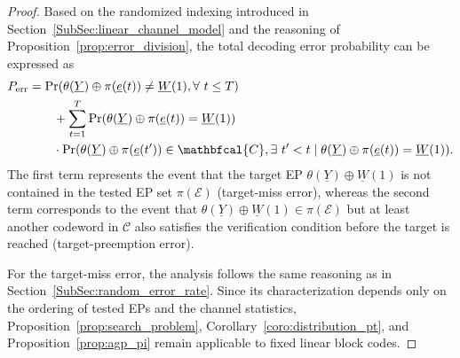 \documentclass[letterpaper,draftclsnofoot,onecolumn]{IEEEtran}
\begin{document}
\begin{proof}
    Based on the randomized indexing introduced in Section~\ref{SubSec:linear_channel_model} and the reasoning of Proposition~\ref{prop:error_division}, the total decoding error probability can be expressed as
    \begin{align}
        P_{\text{err}} & = \Pr(\theta(\underline{Y})\oplus \pi(\underline{e}(t))\neq \underline{W}(1),\forall\ t\leq  T) \notag\\
        & \quad \quad + \sum_{t=1}^{T}\Pr(\theta(\underline{Y})\oplus \pi(\underline{e}(t)) = \underline{W}(1)) \notag\\
        & \quad \quad \cdot\Pr(\theta(\underline{Y})\oplus \pi(\underline{e}(t'))\in \mathbfcal{C},\exists\ t'< t \mid \theta(\underline{Y})\oplus \pi(\underline{e}(t))=\underline{W}(1)). \label{eq:err_div_linear}
    \end{align}
    The first term represents the event that the target EP $\theta(\underline{Y}) \oplus \underline{W}(1)$ is not contained in the tested EP set $\pi(\mathcal{E})$ (target-miss error), whereas the second term corresponds to the event that $\theta(\underline{Y}) \oplus \underline{W}(1)\in\pi(\mathcal{E})$ but at least another codeword in $\mathcal{C}$ also satisfies the verification condition before the target is reached (target-preemption error).

    For the target-miss error, the analysis follows the same reasoning as in Section~\ref{SubSec:random_error_rate}. Since its characterization depends only on the ordering of tested EPs and the channel statistics, Proposition~\ref{prop:search_problem}, Corollary~\ref{coro:distribution_pt}, and Proposition~\ref{prop:agp_pi} remain applicable to fixed linear block codes.


\end{proof}
\end{document}
